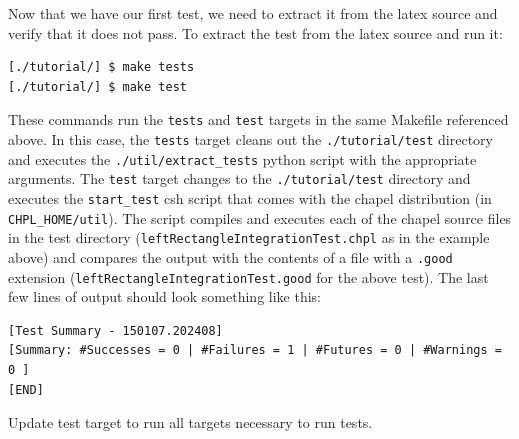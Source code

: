 \begin{seamlessnote}
Now that we have our first test, we need to extract it from the latex source and verify
that it does not pass.
To extract the test from the latex source and run it:
\begin{verbatim}
[./tutorial/] $ make tests
[./tutorial/] $ make test
\end{verbatim}
These commands run the \lstinline{tests} and \lstinline{test} targets in the same Makefile referenced above.
In this case, the \lstinline{tests} target cleans out the \lstinline{./tutorial/test} directory and
executes the \lstinline{./util/extract_tests} python script with the appropriate arguments.
The \lstinline{test} target changes to the \lstinline{./tutorial/test} directory and 
executes the \lstinline{start_test} csh script that comes with
the chapel distribution (in \lstinline{CHPL_HOME/util}). The script compiles and executes each of the
chapel source files in the test directory 
(\eg \lstinline{leftRectangleIntegrationTest.chpl} as in the example above) 
and compares the output with the contents of a file with a \lstinline{.good} extension
(\eg \lstinline{leftRectangleIntegrationTest.good} for the above test). 
The last few lines of output should look something like this:
\begin{verbatim}
[Test Summary - 150107.202408]
[Summary: #Successes = 0 | #Failures = 1 | #Futures = 0 | #Warnings = 0 ]
[END]
\end{verbatim}
\end{seamlessnote}

\begin{TODO}
  Update test target to run all targets necessary to run tests.
\end{TODO}

